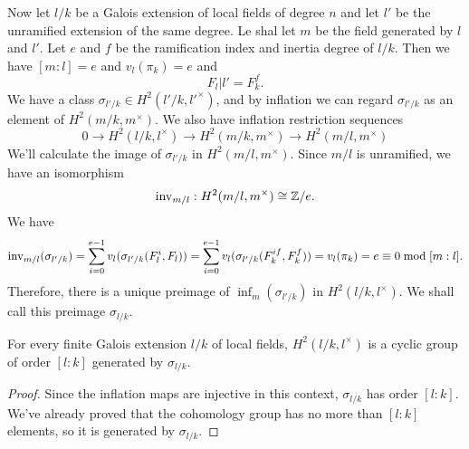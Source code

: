 Now let $l/k$ be a Galois extension of local fields of degree $n$ and let $l'$ be
the unramified extension of the same degree. Le shal let $m$ be the field generated by $l$ and $l'$.
Let $e$ and $f$ be the ramification index and inertia degree of $l/k$.
Then we have $[m:l] = e$ and $v_l(\pi_k)= e$ and
\[
	F_l|l' = F_k^f.
\]
We have a class $\sigma_{l'/k} \in H^2(l'/k,l'^\times)$, and by inflation we can regard
$\sigma_{l'/k}$ as an element of $H^2(m/k,m^\times)$.
We also have inflation restriction sequences
\[
	0 \to H^2(l/k, l^\times) \to H^2(m/k , m^\times) \to H^2(m/l, m^\times)
\]
We'll calculate the image of $\sigma_{l'/k}$ in $H^2(m/l, m^\times)$.
Since $m/l$ is unramified, we have an isomorphism
\[
	\mathrm{inv}_{m/l} : H^2(m/l, m^\times) \cong {\mathbb Z}/ e.
\]
We have
\[
	\mathrm{inv}_{m/l}(\sigma_{l'/k})
	=
	\sum_{i=0}^{e-1} v_l (\sigma_{l'/k}(F_l^i,F_l))
	=
	\sum_{i=0}^{e-1} v_l (\sigma_{l'/k}(F_k^{if},F_k^f))
	=
	v_l (\pi_k)
	= e
	\equiv 0 \bmod [m:l].
\]
Therefore, there is a unique preimage of $\inf_m(\sigma_{l'/k})$ in $H^2(l/k,l^\times)$.
We shall call this preimage $\sigma_{l/k}$.

\begin{theorem} \label{H2 local cyclic}
	For every finite Galois extension $l/k$ of local fields,
	$H^2(l/k,l^\times)$ is a cyclic group of order $[l:k]$ generated by $\sigma_{l/k}$.
\end{theorem}

\begin{proof}
	Since the inflation maps are injective in this context, $\sigma_{l/k}$ has order $[l:k]$.
	We've already proved that the cohomology group has no more than $[l:k]$ elements, so
	it is generated by $\sigma_{l/k}$.
\end{proof}
